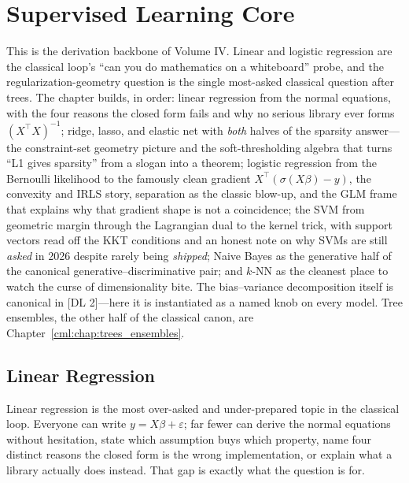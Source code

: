 \chapter{Supervised Learning Core}
\label{cml:chap:supervised_core}

\begin{tldr}
This is the derivation backbone of Volume IV. Linear and logistic regression are the classical loop's ``can you do mathematics on a whiteboard'' probe, and the regularization-geometry question is the single most-asked classical question after trees. The chapter builds, in order: linear regression from the normal equations, with the four reasons the closed form fails and why no serious library ever forms $(X^{\top}X)^{-1}$; ridge, lasso, and elastic net with \emph{both} halves of the sparsity answer---the constraint-set geometry picture and the soft-thresholding algebra that turns ``L1 gives sparsity'' from a slogan into a theorem; logistic regression from the Bernoulli likelihood to the famously clean gradient $X^{\top}(\sigma(X\beta)-y)$, the convexity and IRLS story, separation as the classic blow-up, and the GLM frame that explains why that gradient shape is not a coincidence; the SVM from geometric margin through the Lagrangian dual to the kernel trick, with support vectors read off the KKT conditions and an honest note on why SVMs are still \emph{asked} in 2026 despite rarely being \emph{shipped}; Naive Bayes as the generative half of the canonical generative--discriminative pair; and $k$-NN as the cleanest place to watch the curse of dimensionality bite. The bias--variance decomposition itself is canonical in [DL 2]---here it is instantiated as a named knob on every model. Tree ensembles, the other half of the classical canon, are Chapter~\ref{cml:chap:trees_ensembles}.
\end{tldr}

\section{Linear Regression}
\label{cml:sec:linear_regression}

Linear regression is the most over-asked and under-prepared topic in the classical loop. Everyone can write $y = X\beta + \varepsilon$; far fewer can derive the normal equations without hesitation, state which assumption buys which property, name four distinct reasons the closed form is the wrong implementation, or explain what a library actually does instead. That gap is exactly what the question is for.

